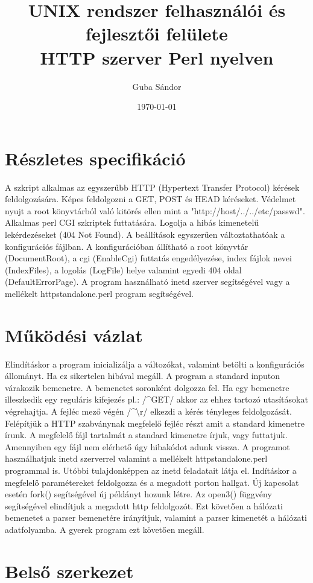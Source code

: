 \documentclass[12pt,a4paper]{article}
\title{UNIX rendszer felhasználói és fejlesztői felülete\\
HTTP szerver Perl nyelven}
\author{Guba Sándor}
\date{\today}
\begin{document}
\maketitle
\newpage
\section{Részletes specifikáció}
A szkript alkalmas az egyszerűbb HTTP (Hypertext Transfer Protocol) kérések feldolgozására. Képes feldolgozni a GET, POST és HEAD kéréseket. Védelmet nyujt a root könyvtárból való kitörés ellen mint a "http://host/../../etc/passwd". Alkalmas perl CGI szkriptek futtatására. Logolja a hibás kimenetelű lekérdezéseket (404 Not Found). A beállítások egyszerűen változtathatóak a konfigurációs fájlban. A konfigurációban állítható a root könyvtár (DocumentRoot), a cgi (EnableCgi) futtatás engedélyezése, index fájlok nevei (IndexFiles), a logolás (LogFile) helye valamint egyedi 404 oldal (DefaultErrorPage). A program használható inetd szerver segítségével vagy a mellékelt httpstandalone.perl program segítségével.

\section{Működési vázlat}
Elindításkor a program inicializálja a változókat, valamint betölti a konfigurációs állományt. Ha ez sikertelen hibával megáll. A program a standard inputon várakozik bemenetre. A bemenetet soronként dolgozza fel. Ha egy bemenetre illeszkedik egy reguláris kifejezés pl.: /\^{}GET/ akkor az ehhez tartozó utasításokat végrehajtja. A fejléc mező végén /\^{}\textbackslash r/ elkezdi a kérés tényleges feldolgozását. Felépítjük a HTTP szabványnak megfelelő fejléc részt amit a standard kimenetre írunk. A megfelelő fájl tartalmát a standard kimenetre írjuk, vagy futtatjuk. Amennyiben egy fájl nem elérhető úgy hibakódot adunk vissza. A programot használhatjuk inetd szerverrel valamint a mellékelt httpstandalone.perl programmal is. Utóbbi tulajdonképpen az inetd feladatait látja el. Indításkor a megfelelő paramétereket feldolgozza és a megadott porton hallgat. Új kapcsolat esetén fork() segítségével új példányt hozunk létre. Az open3() függvény segítségével elindítjuk a megadott http feldolgozót. Ezt követően a hálózati bemenetet a parser bemenetére irányítjuk, valamint a parser kimenetét a hálózati adatfolyamba. A gyerek program ezt követően megáll.
\section{Belső szerkezet}
\end{document}
